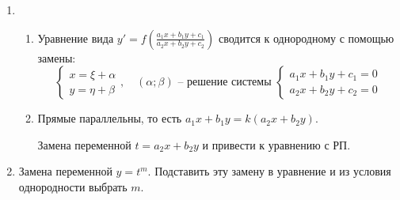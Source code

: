 \documentclass[11pt,a4paper,oneside]{report}
\theoremstyle{definition}
\theoremstyle{plain}
\theoremstyle{remark}
\begin{document}
\begin{enumerate}
    \item \begin{enumerate}
              \item Уравнение вида $y' = f\left(\frac{a_1x + b_1y + c_1}{a_2x + b_2y + c_2}\right)$ сводится к однородному с помощью замены:
                    \begin{equation*}
                        \left\{\begin{array}{l}
                            x = \xi + \alpha \\
                            y = \eta + \beta
                        \end{array}\right.,\quad (\alpha;\beta)\text{ -- решение системы }\left\{\begin{array}{l}
                            a_1x + b_1y + c_1 = 0 \\
                            a_2x + b_2y + c_2 = 0
                        \end{array}\right.
                    \end{equation*}
              \item Прямые параллельны, то есть $a_1x + b_1y = k(a_2x + b_2y)$.

                    Замена переменной $t = a_2x + b_2 y$ и привести к уравнению с РП.
          \end{enumerate}
    \item Замена переменной $y = t^m$. Подставить эту замену в уравнение и из условия однородности выбрать $m$.
\end{enumerate}
\end{document}
